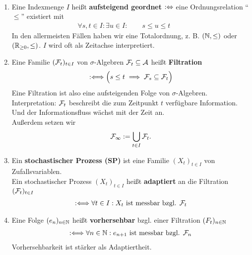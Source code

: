 \begin{defi}\
	\begin{enumerate}[label=(\alph*)]
		\item Eine Indexmenge $I$ heißt \textbf{aufsteigend geordnet} $:\Leftrightarrow$ eine Ordnungsrelation ``$\leq$'' existiert mit
		\begin{align*}
			\forall s,t\in I:\exists u\in I:\qquad s\leq u\leq  t\qquad 
		\end{align*}
		In den allermeisten Fällen haben wir eine Totalordnung, z. B. $(\mathbb{N},\leq)$ oder $(\mathbb{R}_{\geq0},\leq)$. $I$ wird oft als Zeitachse interpretiert.
		\item Eine Familie $(\mathcal{F}_t)_{t\in I}$ von $\sigma$-Algebren $\mathcal{F}_t\subseteq\mathcal{A}$ heißt \textbf{Filtration} 
		\begin{align*}
			:\Longleftrightarrow\Big( s\leq t\implies\mathcal{F}_s\subseteq\mathcal{F}_t\Big)
		\end{align*}
		Eine Filtration ist also eine aufsteigenden Folge von $\sigma$-Algebren.\\
		Interpretation: $\mathcal{F}_t$ beschreibt die zum Zeitpunkt $t$ verfügbare Information. Und der Informationsfluss wächst mit der Zeit an.\\
		Außerdem setzen wir
		\begin{align*}
			\mathcal{F}_\infty:=\bigcup\limits_{t\in I}\mathcal{F}_t.
		\end{align*}
		\item Ein \textbf{stochastischer Prozess (SP)} ist eine Familie $(X_t)_{t\in I}$ von Zufallsvariablen.\\
		Ein stochastischer Prozess $(X_t)_{t\in I}$ heißt \textbf{adaptiert} an die Filtration $(\mathcal{F}_t)_{t\in I}$
		\begin{align*}
			:\Longleftrightarrow\forall t\in I: X_t\text{ ist messbar bzgl. }\mathcal{F}_t
		\end{align*}
		\item Eine Folge $(e_n)_{n\in\mathbb{N}}$ heißt \textbf{vorhersehbar} bzgl. einer Filtration $(F_t)_{n\in\mathbb{N}}$
		\begin{align*}
			:\Longleftrightarrow\forall n\in\mathbb{N}:e_{n+1}\text{ ist messbar bzgl. }\mathcal{F}_n
		\end{align*}
		Vorhersehbarkeit ist stärker als Adaptiertheit.
	\end{enumerate}
\end{defi}

